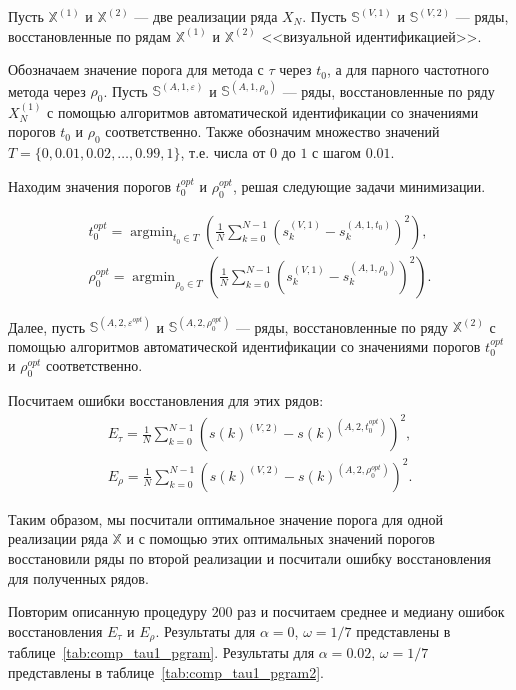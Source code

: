 \documentclass[specialist,
               substylefile = spbu.rtx,
               subf,href,colorlinks=true, 12pt]{disser}
\def\argmin{\mathop{\mathrm{argmin}}}
\begin{document}
Пусть $\mathbb{X}^{(1)}$ и $\mathbb{X}^{(2)}$ --- две реализации ряда $X_N$.
Пусть $\mathbb{S}^{(V,1)}$ и  $\mathbb{S}^{(V,2)}$ --- ряды, восстановленные по рядам $\mathbb{X}^{(1)}$ и $\mathbb{X}^{(2)}$ <<визуальной идентификацией>>.


Обозначаем значение порога для метода с $\tau$ через $t_0$, а для парного частотного метода через $\rho_0$. 
Пусть $\mathbb{S}^{(A,1,\varepsilon)}$ и  $\mathbb{S}^{(A,1, \rho_0)}$ --- ряды, восстановленные по ряду $X_N^{(1)}$  с помощью алгоритмов автоматической идентификации со значениями порогов $t_0$ и $\rho_0$ соответственно.
Также обозначим множество значений $T = \{0,0.01,0.02,\ldots, 0.99,1\}$, т.е. числа от $0$ до $1$ с шагом $0.01$.

Находим значения порогов $t_0^{opt}$ и $\rho_0^{opt}$, решая следующие задачи минимизации.

\begin{gather*}
t_0^{opt} = \argmin_{t_0 \in T}{\left(\frac{1}{N}\sum_{k=0}^{N-1}{\left(s_k^{(V,1)} - s_k^{(A,1,t_0)}\right)}^2\right)}, \\
\rho_0^{opt} = \argmin_{\rho_0 \in T}{\left(\frac{1}{N}\sum_{k=0}^{N-1}{\left(s_k^{(V,1)} - s_k^{(A,1,\rho_0)}\right)}    ^2\right)}.
\end{gather*}

Далее, пусть  $\mathbb{S}^{(A,2,\varepsilon^{opt})}$ и  $\mathbb{S}^{(A,2, \rho_0^{opt})}$ --- ряды, восстановленные по ряду $\mathbb{X}^{(2)}$  с помощью алгоритмов автоматической идентификации со значениями порогов $t_0^{opt}$ и $\rho_0^{opt}$ соответственно.

Посчитаем ошибки восстановления для этих рядов:
\begin{gather*}
E_{\tau} = \frac{1}{N}\sum_{k=0}^{N-1}{\left(s(k)^{(V,2)} - s(k)^{(A,2,t_0^{opt})}\right)^2}, \\
E_{\rho} = \frac{1}{N}\sum_{k=0}^{N-1}{\left(s(k)^{(V,2)} - s(k)^{(A,2,\rho_0^{opt})}\right)^2}.
\end{gather*}

Таким образом, мы посчитали оптимальное значение порога для одной реализации ряда $\mathbb{X}$ и с помощью этих оптимальных значений порогов восстановили ряды по второй реализации и посчитали ошибку восстановления для полученных рядов.

Повторим описанную процедуру $200$ раз и посчитаем среднее и медиану ошибок восстановления $E_{\tau}$ и $E_{\rho}$. Результаты для $\alpha = 0$, $\omega = 1/7$ представлены в таблице~\ref{tab:comp_tau1_pgram}. Результаты для $\alpha = 0.02$, $\omega = 1/7$ представлены в таблице~\ref{tab:comp_tau1_pgram2}.
\end{document}
